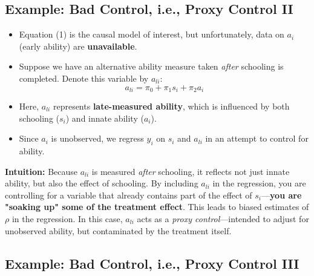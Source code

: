 \documentclass[12pt]{article}
\begin{document}
\subsection*{\noindent\textbf{Example: Bad Control, i.e., Proxy Control II}}

\begin{itemize}
  \item Equation (1) is the causal model of interest, but unfortunately, data on $a_i$ (early ability) are \textbf{unavailable}.

  \item Suppose we have an alternative ability measure taken \textit{after} schooling is completed. Denote this variable by $a_{li}$:
  \begin{equation}
  a_{li} = \pi_0 + \pi_1 s_i + \pi_2 a_i
  \end{equation}

  \item Here, $a_{li}$ represents \textbf{late-measured ability}, which is influenced by both schooling ($s_i$) and innate ability ($a_i$).
  
  \item Since $a_i$ is unobserved, we regress $y_i$ on $s_i$ and $a_{li}$ in an attempt to control for ability.
\end{itemize}

\textbf{Intuition:}  
Because $a_{li}$ is measured \textit{after} schooling, it reflects not just innate ability, but also the effect of schooling. By including $a_{li}$ in the regression, you are controlling for a variable that already contains part of the effect of $s_i$—\textbf{you are "soaking up" some of the treatment effect}. This leads to biased estimates of $\rho$ in the regression. In this case, $a_{li}$ acts as a \textit{proxy control}—intended to adjust for unobserved ability, but contaminated by the treatment itself.

\subsection*{\noindent\textbf{Example: Bad Control, i.e., Proxy Control III}}
\end{document}
